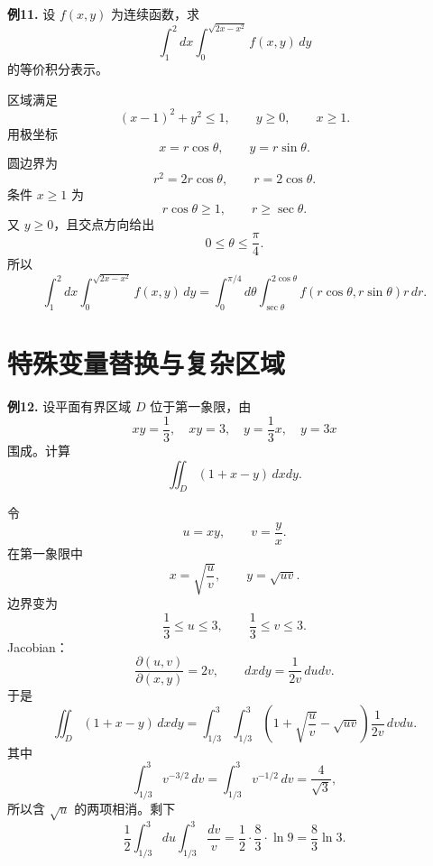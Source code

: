 \begin{problemblock}
\textbf{例11.} 设 \(f(x,y)\) 为连续函数，求
\[
\int_1^2dx\int_0^{\sqrt{2x-x^2}}f(x,y)\,dy
\]
的等价积分表示。
\end{problemblock}
\begin{solutionblock}
区域满足
\[
(x-1)^2+y^2\le1,\qquad y\ge0,\qquad x\ge1.
\]
用极坐标
\[
x=r\cos\theta,\qquad y=r\sin\theta.
\]
圆边界为
\[
r^2=2r\cos\theta,\qquad r=2\cos\theta.
\]
条件 \(x\ge1\) 为
\[
r\cos\theta\ge1,\qquad r\ge\sec\theta.
\]
又 \(y\ge0\)，且交点方向给出
\[
0\le\theta\le\frac\pi4.
\]
所以
\[
\int_1^2dx\int_0^{\sqrt{2x-x^2}}f(x,y)\,dy
=\int_0^{\pi/4}d\theta
\int_{\sec\theta}^{2\cos\theta}
f(r\cos\theta,r\sin\theta)r\,dr.
\]
\end{solutionblock}

\section{特殊变量替换与复杂区域}

\begin{problemblock}
\textbf{例12.} 设平面有界区域 \(D\) 位于第一象限，由
\[
xy=\frac13,\quad xy=3,\quad y=\frac13x,\quad y=3x
\]
围成。计算
\[
\iint_D(1+x-y)\,dxdy.
\]
\end{problemblock}
\begin{solutionblock}
令
\[
u=xy,\qquad v=\frac yx.
\]
在第一象限中
\[
x=\sqrt{\frac uv},\qquad y=\sqrt{uv}.
\]
边界变为
\[
\frac13\le u\le3,\qquad \frac13\le v\le3.
\]
Jacobian：
\[
\frac{\partial(u,v)}{\partial(x,y)}
=2v,
\qquad
dxdy=\frac1{2v}\,dudv.
\]
于是
\[
\iint_D(1+x-y)\,dxdy
=\int_{1/3}^3\int_{1/3}^3
\left(1+\sqrt{\frac uv}-\sqrt{uv}\right)\frac1{2v}\,dvdu.
\]
其中
\[
\int_{1/3}^3v^{-3/2}\,dv
=\int_{1/3}^3v^{-1/2}\,dv=\frac4{\sqrt3},
\]
所以含 \(\sqrt u\) 的两项相消。剩下
\[
\frac12\int_{1/3}^3du\int_{1/3}^3\frac{dv}{v}
=\frac12\cdot\frac83\cdot\ln9
=\frac83\ln3.
\]
\end{solutionblock}

